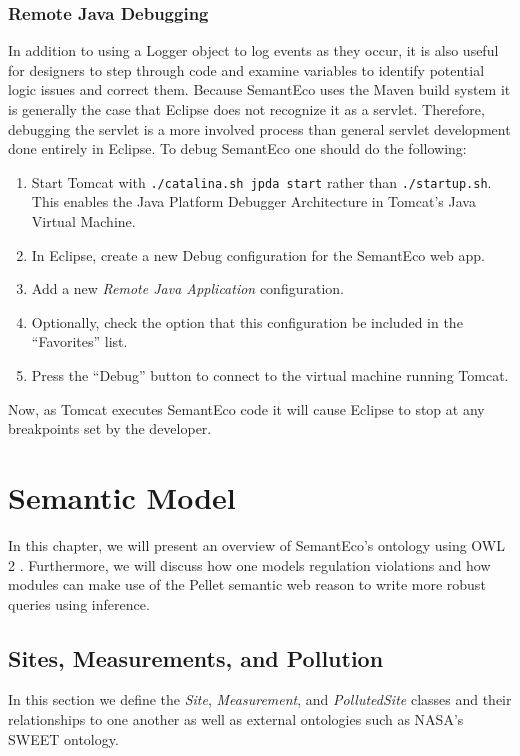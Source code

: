 \documentclass[letterpaper]{report}
\begin{document}
\subsection{Remote Java Debugging}
In addition to using a Logger object to log events as they occur, it is also useful for designers to step through code and examine variables to identify potential logic issues and correct them. Because SemantEco uses the Maven build system it is generally the case that Eclipse does not recognize it as a servlet. Therefore, debugging the servlet is a more involved process than general servlet development done entirely in Eclipse. To debug SemantEco one should do the following:

\begin{enumerate}
\item Start Tomcat with \texttt{./catalina.sh jpda start} rather than \texttt{./startup.sh}. This enables the Java Platform Debugger Architecture in Tomcat's Java Virtual Machine.
\item In Eclipse, create a new Debug configuration for the SemantEco web app.
\item Add a new \textit{Remote Java Application} configuration.
\item Optionally, check the option that this configuration be included in the ``Favorites'' list.
\item Press the ``Debug'' button to connect to the virtual machine running Tomcat.
\end{enumerate}

Now, as Tomcat executes SemantEco code it will cause Eclipse to stop at any breakpoints set by the developer.

\chapter{Semantic Model}
\label{semantic-model}
In this chapter, we will present an overview of SemantEco's ontology using OWL 2 \cite{OWL2}. Furthermore, we will discuss how one models regulation violations and how modules can make use of the Pellet \cite{Pellet} semantic web reason to write more robust queries using inference.
\section{Sites, Measurements, and Pollution}
\label{class-defs}
In this section we define the \textit{Site}, \textit{Measurement}, and \textit{PollutedSite} classes and their relationships to one another as well as external ontologies such as NASA's SWEET ontology.
\end{document}
